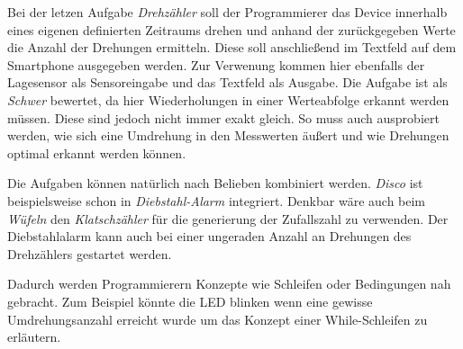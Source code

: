 \documentclass[11pt,a4paper]{report}
\begin{document}
Bei der letzen Aufgabe \textit{Drehzähler} soll der Programmierer das Device innerhalb eines eigenen definierten Zeitraums drehen und anhand der zurückgegeben Werte die Anzahl der Drehungen ermitteln.
Diese soll anschließend im Textfeld auf dem Smartphone ausgegeben werden.
Zur Verwenung kommen hier ebenfalls der Lagesensor als Sensoreingabe und das Textfeld als Ausgabe.
Die Aufgabe ist als \textit{Schwer} bewertet, da hier Wiederholungen in einer Werteabfolge erkannt werden müssen.
Diese sind jedoch nicht immer exakt gleich.
So muss auch ausprobiert werden, wie sich eine Umdrehung in den Messwerten äußert und wie Drehungen optimal erkannt werden können.

Die Aufgaben können natürlich nach Belieben kombiniert werden.
\textit{Disco} ist beispielsweise schon in \textit{Diebstahl-Alarm} integriert.
Denkbar wäre auch beim \textit{Wüfeln} den \textit{Klatschzähler} für die generierung der Zufallszahl zu verwenden.
Der Diebstahlalarm kann auch bei einer ungeraden Anzahl an Drehungen des Drehzählers gestartet werden.

Dadurch werden Programmierern Konzepte wie Schleifen oder Bedingungen nah gebracht.
Zum Beispiel könnte die LED blinken wenn eine gewisse Umdrehungsanzahl erreicht wurde um das Konzept einer While-Schleifen zu erläutern.
\end{document}
